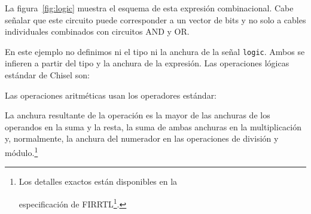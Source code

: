 \documentclass[%
    10pt,
    headinclude, footinclude=false,
    openright, %
    notitlepage,
    cleardoublepage=empty,
    headsepline,
    numbers=noenddot,
    bibliography=totoc, index=totoc,
    ]{scrbook}
\newif\ifbook
\newcommand{\code}[1]{{\lstinline[basicstyle=\small\ttfamily]{#1}}}
\newcommand{\myref}[2]{\href{#1}{#2}}
\renewcommand{\myref}[2]{{#2}{\footnote{\url{#1}}}}
\begin{document}

\noindent La figura~\ref{fig:logic} muestra el esquema de esta expresión combinacional.
Cabe señalar que este circuito puede corresponder a un vector de bits y no solo a cables individuales
combinados con circuitos AND y OR.


En este ejemplo no definimos ni el tipo ni la anchura de la señal \code{logic}.
Ambos se infieren a partir del tipo y la anchura de la expresión.
Las operaciones lógicas estándar de Chisel son:



\noindent Las operaciones aritméticas usan los operadores estándar:




\noindent La anchura resultante de la operación es la mayor de las anchuras de los operandos en
la suma y la resta, la suma de ambas anchuras en la multiplicación y, normalmente,
la anchura del numerador en las operaciones de división y módulo.\footnote{
  Los detalles exactos están disponibles en la
  \ifbook
    especificación de FIRRTL\footnotemark
  \else
    \myref{https://github.com/chipsalliance/firrtl-spec/releases/latest/download/spec.pdf}{especificación de FIRRTL}.
  \fi
}
\ifbook
  \footnotetext{\url{https://github.com/chipsalliance/firrtl-spec/releases/latest/download/spec.pdf}}
\fi
\end{document}
